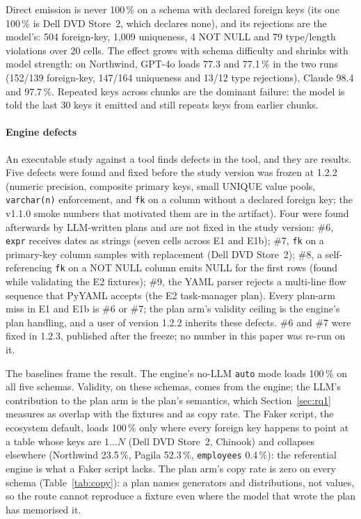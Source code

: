 \documentclass[preprint,12pt]{elsarticle}
\begin{document}
Direct emission is never 100\,\% on a schema with declared foreign keys (its one 100\,\% is Dell DVD Store~2, which declares none), and its rejections are the model's: 504 foreign-key, 1,009 uniqueness, 4 NOT NULL and 79 type/length violations over 20 cells. The effect grows with schema difficulty and shrinks with model strength: on Northwind, GPT-4o loads 77.3 and 77.1\,\% in the two runs (152/139 foreign-key, 147/164 uniqueness and 13/12 type rejections), Claude 98.4 and 97.7\,\%. Repeated keys across chunks are the dominant failure: the model is told the last 30 keys it emitted and still repeats keys from earlier chunks.

\paragraph{Engine defects} An executable study against a tool finds defects in the tool, and they are results. Five defects were found and fixed before the study version was frozen at 1.2.2 (numeric precision, composite primary keys, small UNIQUE value pools, \texttt{varchar(n)} enforcement, and \texttt{fk} on a column without a declared foreign key; the v1.1.0 smoke numbers that motivated them are in the artifact). Four were found afterwards by LLM-written plans and are not fixed in the study version: \#6, \texttt{expr} receives dates as strings (seven cells across E1 and E1b); \#7, \texttt{fk} on a primary-key column samples with replacement (Dell DVD Store~2); \#8, a self-referencing \texttt{fk} on a NOT NULL column emits NULL for the first rows (found while validating the E2 fixtures); \#9, the YAML parser rejects a multi-line flow sequence that PyYAML accepts (the E2 task-manager plan). Every plan-arm miss in E1 and E1b is \#6 or \#7; the plan arm's validity ceiling is the engine's plan handling, and a user of version 1.2.2 inherits these defects. \#6 and \#7 were fixed in 1.2.3, published after the freeze; no number in this paper was re-run on it.

The baselines frame the result. The engine's no-LLM \texttt{auto} mode loads 100\,\% on all five schemas. Validity, on these schemas, comes from the engine; the LLM's contribution to the plan arm is the plan's semantics, which Section~\ref{sec:rq1} measures as overlap with the fixtures and as copy rate. The Faker script, the ecosystem default, loads 100\,\% only where every foreign key happens to point at a table whose keys are $1\ldots N$ (Dell DVD Store~2, Chinook) and collapses elsewhere (Northwind 23.5\,\%, Pagila 52.3\,\%, \texttt{employees} 0.4\,\%): the referential engine is what a Faker script lacks. The plan arm's copy rate is zero on every schema (Table~\ref{tab:copy}): a plan names generators and distributions, not values, so the route cannot reproduce a fixture even where the model that wrote the plan has memorised it.
\end{document}
